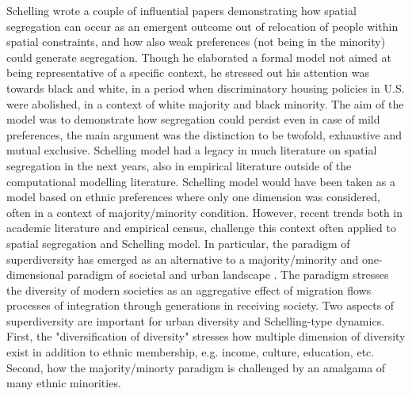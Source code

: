 \documentclass[
]{article}
\begin{document}
Schelling wrote a couple of influential papers demonstrating how spatial segregation can occur as an emergent outcome out of relocation of people within spatial constraints, and how also weak preferences (not being in the minority) could generate segregation.
Though he elaborated a formal model not aimed at being representative of a specific context, he stressed out his attention was towards black and white, in a period when discriminatory housing policies in U.S. were abolished, in a context of white majority and black minority. The aim of the model was to demonstrate how segregation could persist even in case of mild preferences, the main argument was the distinction to be twofold, exhaustive and mutual exclusive.
Schelling model had a legacy in much literature on spatial segregation in the next years, also in empirical literature outside of the computational modelling literature. Schelling model would have been taken as a model based on ethnic preferences where only one dimension was considered, often in a context of majority/minority condition. However, recent trends both in academic literature and empirical census, challenge this context often applied to spatial segregation and Schelling model. In particular, the paradigm of superdiversity has emerged as an alternative to a majority/minority and one-dimensional paradigm of societal and urban landscape \citep{vertovec2007super}. The paradigm stresses the diversity of modern societies as an aggregative effect of migration flows processes of integration through generations in receiving society. Two aspects of superdiversity are important for urban diversity and Schelling-type dynamics. First, the "diversification of diversity" stresses how multiple dimension of diversity exist in addition to ethnic membership, e.g. income, culture, education, etc. Second, how the majority/minorty paradigm is challenged by an amalgama of many ethnic minorities.
\end{document}

